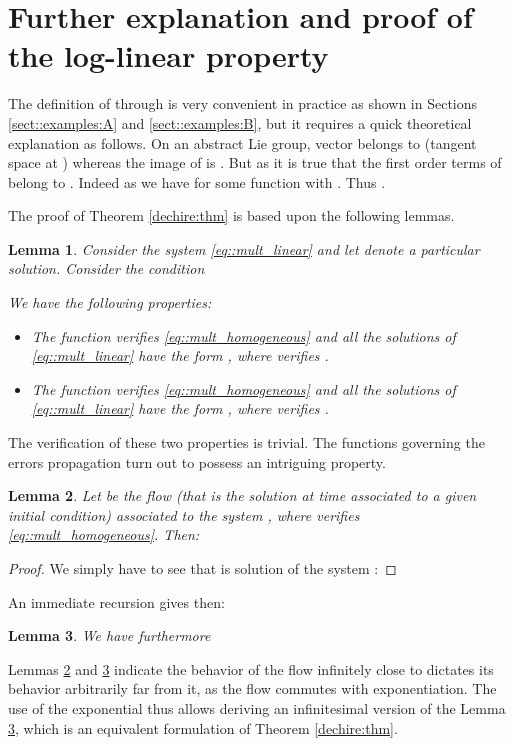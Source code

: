 \documentclass[a4paper,12pt,onecolumn]{article}
\newtheorem{lem}{Lemma}
\begin{document}
\section{Further explanation and proof of the log-linear property}


The definition of  through   is very convenient in practice as shown in Sections \ref{sect::examples:A} and \ref{sect::examples:B}, but it requires a quick theoretical explanation  as follows. 
On an abstract Lie group, vector  belongs to  (tangent space at ) whereas the image of  is . But as  it is true that the first order terms of   belong to . Indeed as  we have  for some function  with . Thus .

The proof of Theorem \ref{dechire:thm} is based upon the following lemmas.
\begin{lem}Consider the system \eqref{eq::mult_linear} and let  denote a particular solution. Consider the condition

We have the following properties:
\begin{itemize}
\item The function   verifies \eqref{eq::mult_homogeneous} and all the solutions of \eqref{eq::mult_linear} have the form , where  verifies .
\item The function   verifies  \eqref{eq::mult_homogeneous} and all the solutions of \eqref{eq::mult_linear} have the form , where  verifies .
\end{itemize}
\end{lem}
The verification of these two properties is trivial. The functions  governing the errors propagation turn out to possess an intriguing property. 
\begin{lem}
\label{prop::product}
Let  be the flow (that is the solution at time  associated to a given initial condition) associated to the system , where  verifies \eqref{eq::mult_homogeneous}. Then:

\end{lem}
\begin{proof}
We simply have to see that  is solution of the system :

\end{proof}
An immediate recursion gives then:


\begin{lem}
\label{prop::power}
We have furthermore

\end{lem}
Lemmas \ref{prop::product} and \ref{prop::power} indicate the behavior of the flow infinitely close to  dictates its behavior arbitrarily far from it, as the flow commutes with exponentiation. The use of the exponential thus allows deriving an infinitesimal version of the Lemma \ref{prop::power}, which is an equivalent formulation of Theorem \ref{dechire:thm}.
\end{document}
